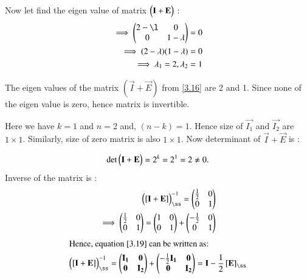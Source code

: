 \documentclass[journal,12pt,twocolumn]{IEEEtran}
\begin{document}
Now let find the eigen value of matrix $\begin{pmatrix}\mathbf{I} + \mathbf{E}\end{pmatrix}$ :
\begin{align}
\implies \myvec{2 - \l  & 0 \\ 0  &  1 - \lambda} = 0\\
\implies (2-\lambda)(1 - \lambda) = 0\\
\implies \lambda_1 = 2, \lambda_2 = 1 \label{3.16}
\end{align}
 
The eigen values of the matrix $(\vec{I} + \vec{E})$ from \eqref{3.16} are  2 and 1. Since none of the eigen value is zero, hence matrix is invertible.

Here we have $k = 1$ and $ n = 2 $ and, $(n - k) = 1$. Hence size of  $\vec{I_1}$ and $\vec{I_2}$  are $ 1 \times 1$. Similarly, size of zero matrix is also $1 \times 1$.
Now determinant of $\vec{I} + \vec{E} $ is :



\begin{align}
\text{det}\begin{pmatrix}\mathbf{I} + \mathbf{E}\end{pmatrix} = 2^k=  2 ^1 = 2 \neq 0.
\end{align}
Inverse of the matrix is :
\begin{align}
  \myvec{ \left[ \vec{I} + \vec{E}\right]}_{\ss}^{-1} = \myvec{\frac{1}{2} & 0 \\ 0 & 1}\\
\implies \myvec{\frac{1}{2} & 0 \\ 0 & 1}  =\myvec{1 & 0 \\ 0 & 1} +  \myvec{ -\frac{1}{2} & 0 \\ 0 & 1} \label{3.19}
\end{align}
\begin{align}
\intertext{Hence, equation \eqref{3.19} can be written as:}
   \myvec{ \left[ \vec{I} + \vec{E}\right]}_{\ss}^{-1}  = \myvec{\vec{I_1} & \vec{0} \\
	\vec{0} & \vec{I_2} } +  \myvec{-\frac{1}{2}\vec{I_1} & \vec{0} \\
	\vec{0} & \vec{I_2}} = \vec{I} - \frac{1}{2}\left[\vec{E}\right]_{\ss}
\end{align}



















	
	
\end{document}
